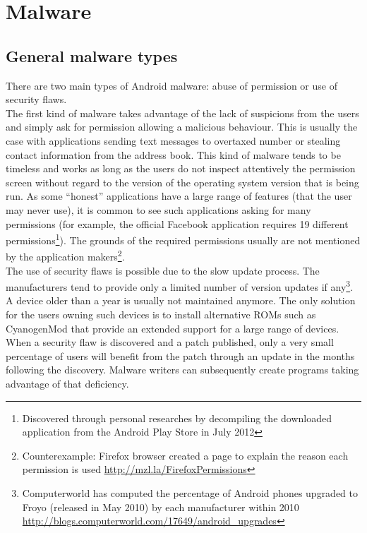 \section{Malware}
\label{sec:and-malware}

\subsection{General malware types}
\label{sec:malware-type}

There are two main types of Android malware: abuse of permission or use of security flaws.\\

The first kind of malware takes advantage of the lack of suspicions from the users and simply ask for permission allowing a malicious behaviour.
This is usually the case with applications sending text messages to overtaxed number or stealing contact information from the address book.
This kind of malware tends to be timeless and works as long as the users do not inspect attentively the permission screen without regard to the version of the operating system version that is being run.
As some ``honest'' applications have a large range of features (that the user may never use), it is common to see such applications asking for many permissions (for example, the official Facebook application requires 19 different permissions\footnote{Discovered through personal researches by decompiling the downloaded application from the Android Play Store in July 2012}).
The grounds of the required permissions usually are not mentioned by the application makers\footnote{Counterexample: Firefox browser created a page to explain the reason each permission is used \url{http://mzl.la/FirefoxPermissions}}.\\

The use of security flaws is possible due to the slow update process.
The manufacturers tend to provide only a limited number of version updates if any\footnote{Computerworld has computed the percentage of Android phones upgraded to Froyo (released in May 2010) by each manufacturer within 2010 \url{http://blogs.computerworld.com/17649/android_upgrades}}.
A device older than a year is usually not maintained anymore.
The only solution for the users owning such devices is to install alternative ROMs such as CyanogenMod that provide an extended support for a large range of devices.
When a security flaw is discovered and a patch published, only a very small percentage of users will benefit from the patch through an update in the months following the discovery.
Malware writers can subsequently create programs taking advantage of that deficiency.\\

